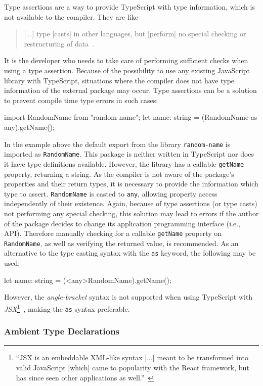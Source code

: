 Type assertions are a way to provide TypeScript with type information, which is not available to the compiler. They are like
\begin{quote}
  [...] type [casts] in other languages, but [perform] no special checking or restructuring of data~\cite{TypeScriptHandbook:BasicTypes}.
\end{quote}
It is the developer who needs to take care of performing sufficient checks when using a type assertion. Because of the possibility to use any existing JavaScript library with TypeScript, situations where the compiler does not have type information of the external package may occur. Type assertions can be a solution to prevent compile time type errors in such cases:
\begin{JsCode}[numbers=none]
import RandomName from "random-name";
let name: string = (RandomName as any).getName();
\end{JsCode}
In the example above the default export from the library \texttt{random-name} is imported as \texttt{RandomName}. This package is neither written in TypeScript nor does it have type definitions available. However, the library has a callable \texttt{getName} property, returning a string. As the compiler is not aware of the package's properties and their return types, it is necessary to provide the information which type to assert. \texttt{RandomName} is casted to \texttt{any}, allowing property access independently of their existence. Again, because of type assertions (or type casts) not performing any special checking, this solution may lead to errors if the author of the package decides to change its application programming interface (i.e., API). Therefore manually checking for a callable \texttt{getName} property on \texttt{RandomName}, as well as verifying the returned value, is recommended.
As an alternative to the type casting syntax with the \texttt{as} keyword, the following may be used:
\begin{JsCode}[numbers=none]
let name: string = (<any>RandomName).getName();
\end{JsCode}
However, the \emph{angle-bracket} syntax is not supported when using TypeScript with \emph{JSX}\footnote{``JSX is an embeddable XML-like syntax [...] meant to be transformed into valid JavaScript [which] came to popularity with the React framework, but has since seen other applications as well.''~\cite{TypeScriptHandbook:JSX}}~\cite{TypeScriptHandbook:BasicTypes}, making the \texttt{as} syntax preferable.

\subsubsection{Ambient Type Declarations}
\label{sec:ts-ambient-type-declarations}

